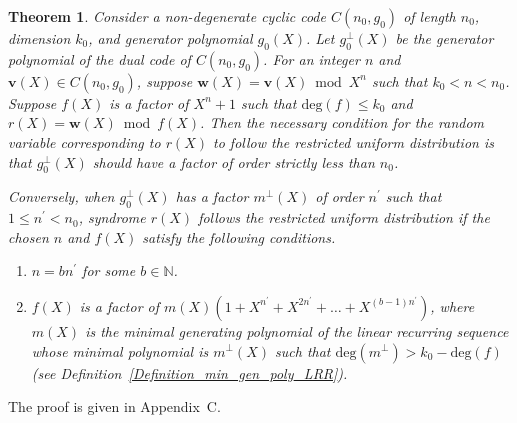 \documentclass[10pt,journal]{IEEEtran}
\newtheorem{theorem}{Theorem}
\def \deg{{\mathrm{deg}}}
\begin{document}
% 
\begin{theorem}
\label{Theorem_main_iff_structure}
% 
Consider a non-degenerate cyclic code $C(n_0,g_0)$ of length $n_0$, dimension $k_0$, and generator polynomial $g_0(X)$.
Let $g_0^{\perp}(X)$ be the generator polynomial of the dual code of $C(n_0,g_0)$.
For an integer $n$ and $\mathbf{v}(X) \in C(n_0,g_0)$, suppose $\mathbf{w}(X) = \mathbf{v}(X) \bmod X^n$ such that $k_0 < n < n_0$.
Suppose $f(X)$ is a factor of $X^n+1$ such that $\deg(f) \leq k_0$ and $r(X) = \mathbf{w}(X) \bmod f(X)$.
Then the necessary condition for the random variable corresponding to $r(X)$ to follow the restricted uniform distribution is 
that $g_0^{\perp}(X)$ should have a factor of order strictly less than $n_0$.

Conversely, when $g_0^{\perp}(X)$ has a factor $m^{\perp}(X)$ of order $n^{\prime}$ such that $1 \leq n^{\prime} < n_0$, 
syndrome 
$r(X)$ follows the restricted uniform distribution if the chosen $n$ and $f(X)$ satisfy the following conditions.
% 
\begin{enumerate}
% 
\item $n=bn^{\prime}$ for some $b \in \mathbb{N}$.
%  
\item $f(X)$ is a factor of $m(X)(1+X^{n^{\prime}}+X^{2n^{\prime}}+\ldots+X^{(b-1)n^{\prime}})$, where 
$m(X)$ is the minimal generating polynomial of the linear recurring sequence whose minimal polynomial is $m^{\perp}(X)$ 
such that $\deg(m^{\perp}) > k_0-\deg(f)$ (see Definition~\ref{Definition_min_gen_poly_LRR}).
%  
\end{enumerate}
% 
\end{theorem}
% 
\begin{IEEEproof}
%  
The proof is given in Appendix~C. 
% 
\end{IEEEproof}
% 
\end{document}
